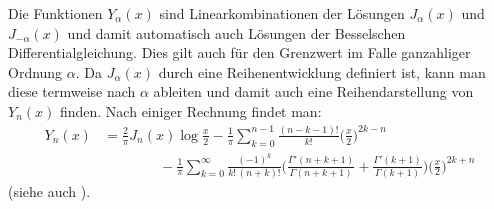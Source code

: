 Die Funktionen $Y_\alpha(x)$ sind Linearkombinationen der Lösungen
$J_\alpha(x)$ und $J_{-\alpha}(x)$ und damit automatisch auch Lösungen
der Besselschen Differentialgleichung.
Dies gilt auch für den Grenzwert im Falle ganzahliger Ordnung $\alpha$.
Da $J_{\alpha}(x)$ durch eine Reihenentwicklung definiert ist, kann man
diese termweise nach $\alpha$ ableiten und damit auch eine 
Reihendarstellung von $Y_n(x)$ finden.
Nach einiger Rechnung findet man:
\begin{align*}
Y_n(x)
&=
\frac{2}{\pi}J_n(x)\log\frac{x}2
-
\frac1{\pi}
\sum_{k=0}^{n-1} \frac{(n-k-1)!}{k!}\biggl(\frac{x}2\biggr)^{2k-n}
\\
&\qquad\qquad
-
\frac1{\pi}
\sum_{k=0}^\infty \frac{(-1)^k}{k!\,(n+k)!}
\biggl(
\frac{\Gamma'(n+k+1)}{\Gamma(n+k+1)}
+
\frac{\Gamma'(k+1)}{\Gamma(k+1)}
\biggr)
\biggl(
\frac{x}2
\biggr)^{2k+n}
\end{align*}
(siehe auch \cite[p.~200]{buch:specialfunctions}).


